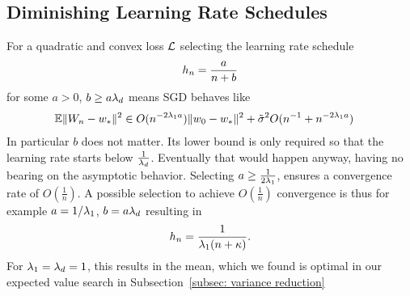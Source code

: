 \subsection{Diminishing Learning Rate Schedules}

\begin{theorem}\label{thm: convergence rates for diminishing lr schedules}
	For a quadratic and convex loss \(\mathcal{L}\) selecting the learning rate
	schedule
	\begin{align*}
		h_n = \frac{a}{n+b}	
	\end{align*}
	for some \(a>0\), \(b\ge a\lambda_d\) means SGD behaves like
	\begin{align*}
		\mathbb{E}\|W_n - w_*\|^2 
		&\in O(n^{-2\lambda_1a})\|w_0-w_*\|^2
		+ \tilde{\sigma}^2 O(n^{-1} + n^{-2\lambda_1 a})
	\end{align*}
	In particular \(b\) does not matter. Its lower bound is only required so that
	the learning rate starts below \(\tfrac1{\lambda_d}\). Eventually
	that would happen anyway, having no bearing on the asymptotic behavior.
	Selecting \(a\ge\tfrac{1}{2\lambda_1}\), ensures a convergence rate of
	\(O(\tfrac1n)\). A possible selection to
	achieve \(O(\tfrac1n)\) convergence is thus for example \(a=1/\lambda_1\),
	\(b=a\lambda_d\) resulting in
	\begin{align*}
		h_n = \frac{1}{\lambda_1(n+\kappa)}.
	\end{align*}
	For \(\lambda_1=\lambda_d=1\), this results in the mean, which we
	found is optimal in our expected value search in Subsection~\ref{subsec:
	variance reduction}
\end{theorem}

